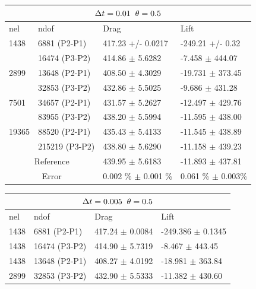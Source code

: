 \begin{table}[h!]
\centering
\label{CFD-3 Results}
\begin{tabular}{ |p{1cm}||p{2.9cm}|p{3.3cm}|p{3.3cm}|}
 \hline
  \multicolumn{4}{|c|}{$\Delta t = 0.01 \hspace{2mm} \theta = 0.5$} \\
   \hline
nel & ndof & Drag  & Lift \\
\hline
 1438    & 6881  (P2-P1)   & 417.23       +/-  0.0217 & -249.21       +/-  0.32  \\
   & 16474 (P3-P2)   & 414.86      $\pm$  5.6282 & -7.458      $\pm$  444.07  \\
 \hline
 2899    & 13648  (P2-P1) & 408.50  $\pm$   4.3029 & -19.731  $\pm$   373.45 \\  
     &  32853 (P3-P2)  & 432.86      $\pm$  5.5025 & -9.686      $\pm$  431.28  \\
  \hline
  7501    & 34657 (P2-P1) & 431.57  $\pm$   5.2627 & -12.497  $\pm$   429.76 \\    
    &  83955 (P3-P2)  & 438.20      $\pm$  5.5994 & -11.595      $\pm$  438.00 \\
    \hline
    19365   & 88520 (P2-P1) & 435.43  $\pm$   5.4133 & -11.545  $\pm$   438.89 \\
   &   215219 (P3-P2) & 438.80      $\pm$  5.6290 & -11.158      $\pm$  439.23 \\
\hline
 \multicolumn{2}{|c|}{Reference}  & 439.95 $\pm$ 5.6183 & -11.893 $\pm$ 437.81\\
 \hline
  \multicolumn{2}{|c|}{Error}  & 0.002 \% $\pm$ 0.001 \% & 0.061 \% $\pm$ 0.003\% \\
  \hline
  \end{tabular}
  \vspace{2cm}
 \begin{tabular}{ |p{1cm}||p{2.9cm}|p{3.3cm}|p{3.3cm}|}
  \hline
  \multicolumn{4}{|c|}{$\Delta t = 0.005 \hspace{2mm} \theta = 0.5$} \\
   \hline
nel & ndof & Drag  & Lift \\
\hline
 1438    & 6881  (P2-P1)   &  417.24  $\pm$  0.0084 & -249.386   $\pm$ 0.1345  \\
 1438    & 16474 (P3-P2)   & 414.90     $\pm$  5.7319 & -8.467 $\pm$  443.45  \\
\hline
 1438    &13648  (P2-P1)   & 408.27   $\pm$ 4.0192 & -18.981   $\pm$ 363.84 \\
 2899    &  32853 (P3-P2)   & 432.90      $\pm$  5.5333 & -11.382      $\pm$  430.60 \\

\end{tabular}
\end{table}
